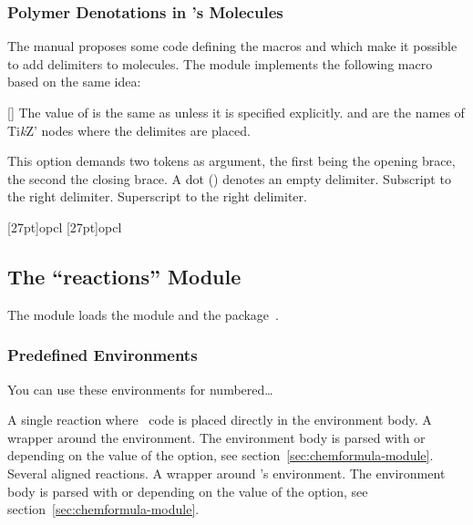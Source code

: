 \documentclass{chemmacros-manual}
\makeatletter
\newcommand*\TikZ{Ti\textit{k}Z}
\def\chemmodule*#1{\textquotedblleft#1\textquotedblright}%
\renewenvironment{commands}
  {%
    \let\command\cnltx@command
    \let\explcommand\cnltx@explcommand
    \cnltxlist
  }
  {\endcnltxlist}
\makeatother
\begin{document}
\subsubsection{Polymer Denotations in 's Molecules}
The  manual proposes some code defining the macros
 and  which make it possible to add
delimiters to  molecules.  The  module
implements the following macro based on the same idea:
\begin{commands}
  \command{makepolymerdelims}[]
    The value of  is the same as  unless it is
    specified explicitly.   and  are the
    names of \TikZ' nodes where the delimites are placed.
\end{commands}
\begin{options}
  \Default{[]}
    This option demands two tokens as argument, the first being the opening
    brace, the second the closing brace.  A dot () denotes an empty
    delimiter.
    Subscript to the right delimiter.
    Superscript to the right delimiter.
\end{options}

\begin{example}
  \makepolymerdelims{5pt}[27pt]{op}{cl}
  \makepolymerdelims[delimiters=()]{5pt}[27pt]{op}{cl}
\end{example}

\subsection{The \chemmodule*{reactions} Module}\label{sec:reactions-module}
The  module loads the  module
and the  package~\cite{pkg:mathtools}.

\subsubsection{Predefined Environments}

You can use these environments for numbered\ldots
\begin{environments}
    A single reaction where \chemformula\ code is placed directly in the
    environment body.  A wrapper around the  environment.  The
    environment body is parsed with  or  depending on the value
    of the  option, see
    section~\vref{sec:chemformula-module}.
    Several aligned reactions.  A wrapper around 's 
    environment.  The environment body is parsed with  or 
    depending on the value of the  option, see
    section~\vref{sec:chemformula-module}.
\end{environments}
\end{document}
